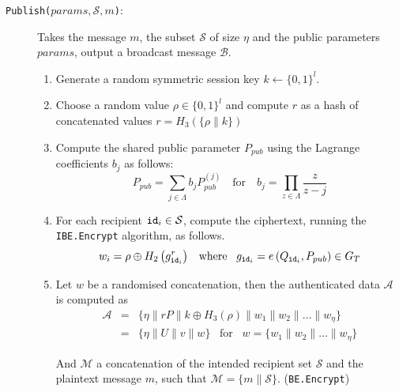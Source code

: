 \newpage
\thispagestyle{empty}
\begin{algorithm}[H]
\begin{description}
    \item[\texttt{Publish($params, \mathcal{S}, m$)}:] Takes the message $m$, the subset $\mathcal{S}$ of size $\eta$ and the public parameters $params$, output a broadcast message $\mathcal{B}$.

    \begin{enumerate}
        \item Generate a random symmetric session key $k \leftarrow \{ 0,1 \}^{l}$.
        \item Choose a random value $\rho \in \{ 0,1 \}^{l}$ and compute $r$ as a hash of concatenated values $r = H_3 \left( \{ \rho \parallel k \} \right)$
        \item Compute the shared public parameter $P_{pub}$ using the Lagrange coefficients $b_j$ as follows:
        \begin{equation*}
         P_{pub} = \sum_{j \in \Lambda} b_j P_{pub}^{\left( j \right)} \quad \textrm{for} \quad b_j = \prod_{z \in \Lambda} \frac{z}{z-j}
        \end{equation*}
        \item For each recipient $\mathtt{id}_{i} \in \mathcal{S}$, compute the ciphertext, running the \texttt{IBE.Encrypt} algorithm, as follows.
            \begin{equation*}
                w_i = \rho \oplus H_2 \left( g_{\mathtt{id}_{i}}^r \right) \; \; \; \textrm{where} \; \; \; g_{\mathtt{id}_{i}} = e \left( Q_{\mathtt{id}_{i}}, P_{pub} \right) \in G_T
            \end{equation*}
        \item Let $w$ be a randomised concatenation, then the authenticated data $\mathcal{A}$ is computed as                                  
        \begin{equation*}
                \begin{array}{lcl}
                    \mathcal{A} & = & \{ \eta \parallel rP \parallel k \oplus H_3 \left( \rho \right) \parallel w_1 \parallel w_2 \parallel \ldots \parallel w_\eta \} \\
                    & = & \{ \eta \parallel U \parallel v \parallel w \} \; \; \; \textrm{for} \; \; \; w = \{ w_1 \parallel w_2 \parallel \ldots \parallel w_\eta \}
                \end{array} 
            \end{equation*}
            
        And $\mathcal{M}$ a concatenation of the intended recipient set $\mathcal{S}$ and the plaintext message $m$, such that $\mathcal{M} = \{ m \parallel \mathcal{S} \}$. (\texttt{BE.Encrypt})
    

\end{enumerate}
\end{description}
\end{algorithm}
